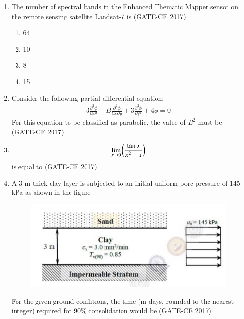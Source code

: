 \documentclass[journal,12pt,onecolumn]{article}
\theoremstyle{remark}
\begin{document}
\begin{enumerate}
    \item The number of spectral bands in the Enhanced Thematic Mapper sensor on the remote sensing satellite Landsat-7 is \hfill (GATE-CE 2017)
    \begin{multicols}{4}
    \begin{enumerate}
        \item 64
        \item 10
        \item 8
        \item 15
    \end{enumerate}
    \end{multicols}

    \item Consider the following partial differential equation: 
    \begin{align}
    3 \frac{\partial^2 \phi}{\partial x^2} + B \frac{\partial^2 \phi}{\partial x \partial y} + 3 \frac{\partial^2 \phi}{\partial y^2} + 4 \phi = 0
    \end{align}
    For this equation to be classified as parabolic, the value of $B^2$ must be \underline{\hspace{3cm}}\hfill (GATE-CE 2017)

    \item 
    \begin{align}
    \lim_{x \to 0} \left(\frac{\tan x}{x^2 - x} \right)
    \end{align}
    is equal to \underline{\hspace{3cm}}\hfill (GATE-CE 2017)

    \item A 3 m thick clay layer is subjected to an initial uniform pore pressure of 145 kPa as shown in the figure 
    \begin{figure}[H]
    \centering
    \includegraphics[width=0.7\columnwidth]{imageq22.jpg}  
    \caption{}
    \label{fig:22}
    \end{figure}
    For the given ground conditions, the time (in days, rounded to the nearest integer) required for 90\% consolidation would be \underline{\hspace{3cm}}\hfill (GATE-CE 2017)


\end{enumerate}
\end{document}
